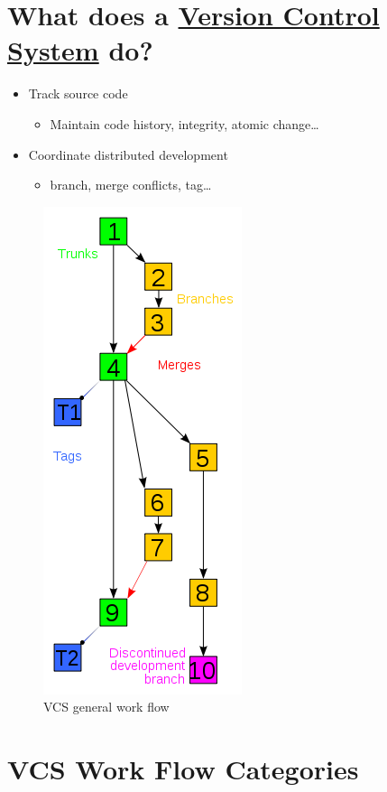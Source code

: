 \documentclass[]{article}
\makeatletter
\def\maxwidth{\ifdim\Gin@nat@width>\linewidth\linewidth
\else\Gin@nat@width\fi}
\let\Oldincludegraphics\includegraphics
\renewcommand{\includegraphics}[1]{\Oldincludegraphics[width=\maxwidth]{#1}}
\makeatother
\begin{document}
\section{What does a
\href{http://en.wikipedia.org/wiki/Revision\_control}{Version Control
System} do?}

\begin{itemize}
\item
  Track source code
  \begin{itemize}
  \item
    Maintain code history, integrity, atomic change\ldots{}
  \end{itemize}
\item
  Coordinate distributed development
  \begin{itemize}
  \item
    branch, merge conflicts, tag\ldots{}
  \end{itemize}
\end{itemize}
\begin{figure}[htbp]
\centering
\includegraphics{figures/vcsflow.png}
\caption{VCS general work flow}
\end{figure}

\section{VCS Work Flow Categories}
\end{document}
